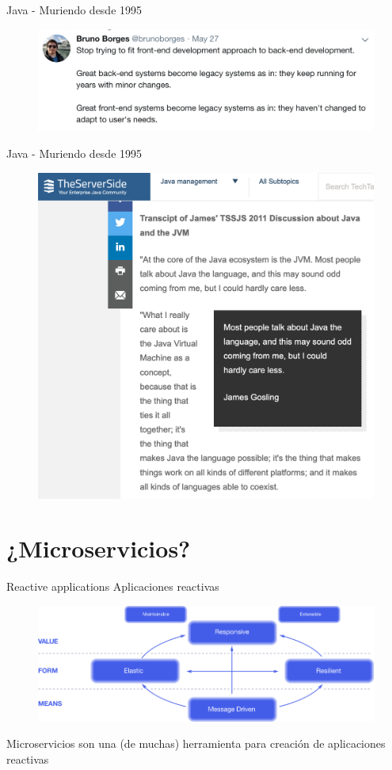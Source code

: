 \documentclass{beamer}
\begin{document}
\begin{frame}{Java - Muriendo desde 1995}

\begin{figure}
	\centering
	\includegraphics[width=\linewidth]{Images/borges}
\end{figure}
\end{frame}


\begin{frame}{Java - Muriendo desde 1995}

		\begin{figure}
			\centering
			\includegraphics[width=0.7\linewidth]{Images/gossling}
		\end{figure}
\end{frame}


\section{¿Microservicios?}

\begin{frame}{Reactive applications}
Aplicaciones reactivas
\begin{figure}
	\centering
	\includegraphics[width=\linewidth]{Images/reactive-traits}
\end{figure}
Microservicios son una (de muchas) herramienta para creación de aplicaciones reactivas
\end{frame}
\end{document}
